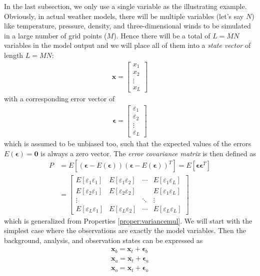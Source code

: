 In the last subsection, we only use a single variable as the illustrating example. Obviously, in actual weather models, there will be multiple variables (let's say $N$) like temperature, pressure, density, and three-dimensional winds to be simulated in a large number of grid points ($M$). Hence there will be a total of $L = MN$ variables in the model output and we will place all of them into a \textit{state vector} of length $L = MN$:
\begin{align}
\textbf{x} = 
\begin{bmatrix}
x_1 \\
x_2 \\
\vdots \\
x_L
\end{bmatrix}
\end{align}
with a corresponding error vector of
\begin{align}
\bm{\epsilon} =  
\begin{bmatrix}
\varepsilon_1 \\
\varepsilon_2 \\
\vdots \\
\varepsilon_L
\end{bmatrix}
\end{align}
which is assumed to be unbiased too, such that the expected values of the errors $E(\bm{\epsilon}) = \textbf{0}$ is always a zero vector. The \textit{error covariance matrix} is then defined as
\begin{align}
P &= E[(\bm{\epsilon} - E(\bm{\epsilon}))(\bm{\epsilon} - E(\bm{\epsilon}))^T] = E[\bm{\epsilon}\bm{\epsilon}^T] \nonumber \\
&= \begin{bmatrix}
E[\varepsilon_1\varepsilon_1] & E[\varepsilon_1\varepsilon_2] & \cdots & E[\varepsilon_1\varepsilon_L] \\
E[\varepsilon_2\varepsilon_1] & E[\varepsilon_2\varepsilon_2] & & E[\varepsilon_1\varepsilon_L] \\
\vdots & & \ddots & \vdots \\
E[\varepsilon_L\varepsilon_1] & E[\varepsilon_L\varepsilon_2] & \cdots & E[\varepsilon_L\varepsilon_L] 
\end{bmatrix}
\end{align}
which is generalized from Properties \ref{proper:variancemul}. We will start with the simplest case where the observations are exactly the model variables. Then the background, analysis, and observation states can be expressed as
\begin{subequations}
\label{eqn:OIxbaoe}
\begin{align}
\textbf{x}_b = \textbf{x}_t + \bm{\epsilon}_b \\
\textbf{x}_a = \textbf{x}_t + \bm{\epsilon}_a \\
\textbf{x}_o = \textbf{x}_t + \bm{\epsilon}_o
\end{align}    
\end{subequations}
